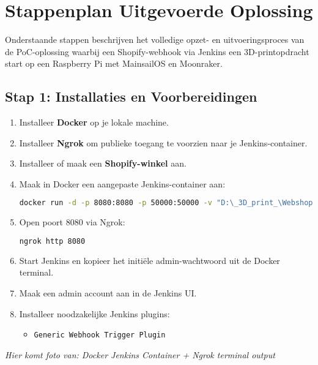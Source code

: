 \section{Stappenplan Uitgevoerde Oplossing}

Onderstaande stappen beschrijven het volledige opzet- en uitvoeringsproces van de PoC-oplossing waarbij een Shopify-webhook via Jenkins een 3D-printopdracht start op een Raspberry Pi met MainsailOS en Moonraker.

\subsection{Stap 1: Installaties en Voorbereidingen}
\begin{enumerate}
    \item Installeer \textbf{Docker} op je lokale machine.
    \item Installeer \textbf{Ngrok} om publieke toegang te voorzien naar je Jenkins-container.
    \item Installeer of maak een \textbf{Shopify-winkel} aan.
    \item Maak in Docker een aangepaste Jenkins-container aan:
    \begin{lstlisting}[language=bash, caption=Docker commando voor Jenkins met volume en poorten]
        docker run -d -p 8080:8080 -p 50000:50000 -v "D:\_3D_print_\Webshop:/var/jenkins_home" --name jenkins-met-backup jenkins-met-wijzigingen:custom
    \end{lstlisting}
    \item Open poort 8080 via Ngrok:
    \begin{lstlisting}[language=bash]
        ngrok http 8080
    \end{lstlisting}
    \item Start Jenkins en kopieer het initiële admin-wachtwoord uit de Docker terminal.
    \item Maak een admin account aan in de Jenkins UI.
    
    \item Installeer noodzakelijke Jenkins plugins:
    \begin{itemize}
        \item \texttt{Generic Webhook Trigger Plugin}
    \end{itemize}
\end{enumerate}

\vspace{0.5em}
\textit{Hier komt foto van: Docker Jenkins Container + Ngrok terminal output}

